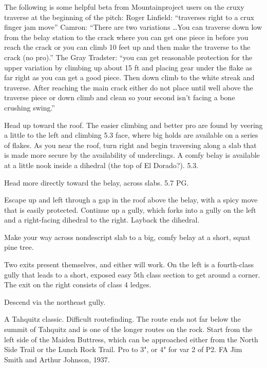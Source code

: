 \documentclass{tahquitz}
\begin{document}
The following is some helpful beta from Mountainproject users on the
cruxy traverse at the beginning of the pitch: Roger Linfield: ``traverses right to a
crux finger jam move''  Camron: ``There are two variations
\ldots You can traverse down low from the belay station to the crack
where you can get one piece in before you reach the crack or you can
climb 10 feet up and then make the traverse to the crack (no pro).''
The Gray Tradster: ``you can get reasonable protection for the upper variation
by climbing up about 15 ft and placing gear under the flake as far
right as you can get a good piece. Then down climb to the white streak
and traverse.  After reaching the main crack either do not place until
well above the traverse piece or down climb and clean so your second
isn't facing a bone crushing swing.''


 Head up toward the roof. The easier climbing and better pro are found
by veering a little to the left and climbing 5.3 face, where big holds are available on a series of flakes.
As you near the roof, turn right and begin traversing
along a slab that is made more secure by the availability of underclings. A comfy
belay is available at a little nook inside a dihedral (the top of El Dorado?). 5.3.

 Head more directly toward the belay, across slabs. 5.7 PG.

 Escape up and left through a gap in the roof above the belay, with a spicy move
that is easily protected. Continue up a gully, which forks into a gully on the left and a right-facing
dihedral to the right. Layback the dihedral.

 Make your way across nondescript slab to a big, comfy belay at a short, squat pine tree.

 Two exits present themselves, and either will work. On the left is a fourth-class
gully that leads to a short, exposed easy 5th class section to get around a corner.
The exit on the right consists of class 4 ledges.

Descend via the northeast gully.





A Tahquitz classic. Difficult routefinding. The route ends not far
below the summit of Tahquitz and is one of the longer routes on the
rock. Start from the left side of the Maiden Buttress, which can be
approached either from the North Side Trail or the Lunch Rock Trail.
Pro to 3", or 4" for var 2 of P2.
FA Jim Smith and Arthur Johnson, 1937.
\end{document}
